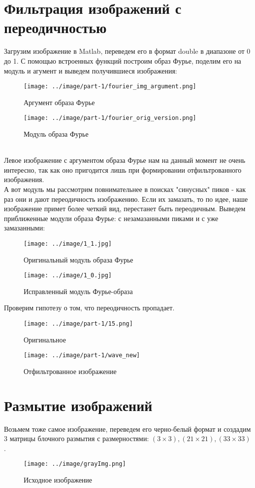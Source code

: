 \section{Фильтрация изображений с переодичностью}
\noindent Загрузим изображение в Matlab, переведем его в формат double в диапазоне от 0 до 1.
\noindent С помощью встроенных функций построим образ Фурье, поделим его на модуль и агумент и выведем получившиеся изображения: 
\begin{figure}[!htb]
    \texttt{[image: ../image/part-1/fourier\_img\_argument.png]}
    \caption{Аргумент образа Фурье}
    \endminipage\hfill
    \texttt{[image: ../image/part-1/fourier\_orig\_version.png]}   
    \caption{Модуль образа Фурье}
    \endminipage\hfill
\end{figure}
\\
\noindent Левое изображение с аргументом образа Фурье нам на данный момент не очень интересно, так как оно пригодится лишь при формировании отфильтрованного изображения.\\
\noindent А вот  модуль мы рассмотрим повнимательнее в поисках "синусных" пиков - как раз они и дают переодичность изображению. Если их замазать, то по идее, наше изображение примет более четкий вид, перестанет быть переодичным.
\noindent Выведем приближенные модули образа Фурье: с незамазанными пиками и с уже замазанными: 
\begin{figure}[!htb]
    \texttt{[image: ../image/1\_1.jpg]}
    \caption{Оригинальный модуль образа Фурье} 
    \endminipage\hfill
    \texttt{[image: ../image/1\_0.jpg]}   
    \caption{Исправленный модуль Фурье-образа}
    \endminipage\hfill
\end{figure}
\newpage 

Проверим гипотезу о том, что переодичность пропадает.
\begin{figure}[!htb]
    \texttt{[image: ../image/part-1/15.png]}
    \caption{Оригинальное} 
    \endminipage\hfill
    \texttt{[image: ../image/part-1/wave\_new]}   
    \caption{Отфильтрованное изображение}
    \endminipage\hfill
\end{figure}
\section{Размытие изображений}
\noindent Возьмем тоже самое изображение, переведем его черно-белый формат и создадим 3 матрицы блочного размытия с размерностями: $(3\times 3), (21\times 21), (33 \times 33)$.
\begin{figure}[!htb]
    \centering
    \texttt{[image: ../image/grayImg.png]}   
    \caption{Исходное изображение}
\end{figure}
\newpage 

